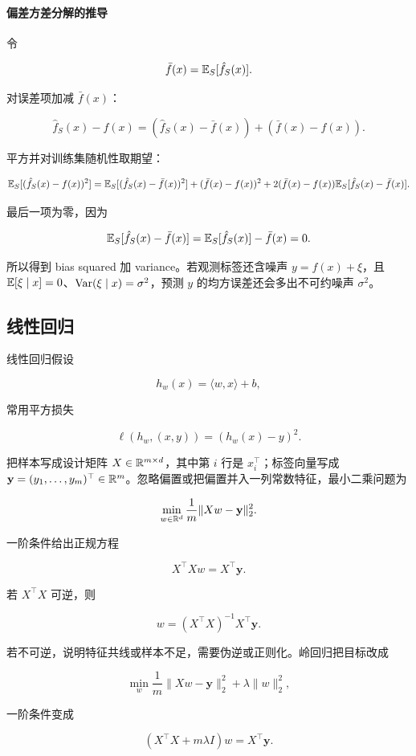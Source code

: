 \paragraph{偏差方差分解的推导}

令

\[
  \bar f(x)=\mathbb{E}_S[\hat f_S(x)].
\]

对误差项加减 \(\bar f(x)\)：

\[
  \hat f_S(x)-f(x)
  =
  \left(\hat f_S(x)-\bar f(x)\right)
  +
  \left(\bar f(x)-f(x)\right).
\]

平方并对训练集随机性取期望：

\[
  \mathbb{E}_S[(\hat f_S(x)-f(x))^2]
  =
  \mathbb{E}_S[(\hat f_S(x)-\bar f(x))^2]
  +
  (\bar f(x)-f(x))^2
  +
  2(\bar f(x)-f(x))
  \mathbb{E}_S[\hat f_S(x)-\bar f(x)].
\]

最后一项为零，因为

\[
  \mathbb{E}_S[\hat f_S(x)-\bar f(x)]
  =
  \mathbb{E}_S[\hat f_S(x)]-\bar f(x)
  =
  0.
\]

所以得到 bias squared 加 variance。若观测标签还含噪声 \(y=f(x)+\xi\)，且 \(\mathbb{E}[\xi\mid x]=0\)、\(\operatorname{Var}(\xi\mid x)=\sigma^2\)，预测 \(y\) 的均方误差还会多出不可约噪声 \(\sigma^2\)。

\subsection{线性回归}

线性回归假设

\[
  h_w(x)=\langle w,x\rangle+b,
\]

常用平方损失

\[
  \ell(h_w,(x,y))=(h_w(x)-y)^2.
\]

把样本写成设计矩阵 \(X\in\mathbb{R}^{m\times d}\)，其中第 \(i\) 行是 \(x_i^\top\)；标签向量写成 \(\mathbf{y}=(y_1,\ldots,y_m)^\top\in\mathbb{R}^m\)。忽略偏置或把偏置并入一列常数特征，最小二乘问题为

\[
  \min_{w\in\mathbb{R}^d}
  \frac1m\|Xw-\mathbf{y}\|_2^2.
\]

一阶条件给出正规方程

\[
  X^\top Xw=X^\top \mathbf{y}.
\]

若 \(X^\top X\) 可逆，则

\[
  w=(X^\top X)^{-1}X^\top \mathbf{y}.
\]

若不可逆，说明特征共线或样本不足，需要伪逆或正则化。岭回归把目标改成

\[
  \min_w
  \frac1m\|Xw-\mathbf{y}\|_2^2+\lambda\|w\|_2^2,
\]

一阶条件变成

\[
  (X^\top X+m\lambda I)w=X^\top \mathbf{y}.
\]

